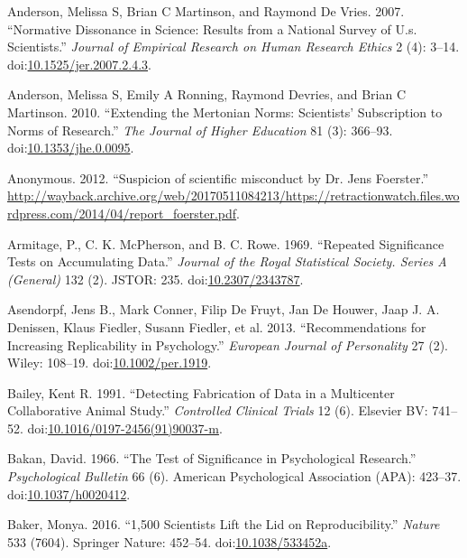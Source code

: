 \documentclass[a5paper]{book}
\begin{document}
\hypertarget{ref-doi:10.1525ux2fjer.2007.2.4.3}{}
Anderson, Melissa S, Brian C Martinson, and Raymond De Vries. 2007.
``Normative Dissonance in Science: Results from a National Survey of
U.s. Scientists.'' \emph{Journal of Empirical Research on Human Research
Ethics} 2 (4): 3--14.
doi:\href{https://doi.org/10.1525/jer.2007.2.4.3}{10.1525/jer.2007.2.4.3}.

\hypertarget{ref-doi:10.1353ux2fjhe.0.0095}{}
Anderson, Melissa S, Emily A Ronning, Raymond Devries, and Brian C
Martinson. 2010. ``Extending the Mertonian Norms: Scientists'
Subscription to Norms of Research.'' \emph{The Journal of Higher
Education} 81 (3): 366--93.
doi:\href{https://doi.org/10.1353/jhe.0.0095}{10.1353/jhe.0.0095}.

\hypertarget{ref-foerster-complaint}{}
Anonymous. 2012. ``Suspicion of scientific misconduct by Dr. Jens
Foerster.''
\url{http://wayback.archive.org/web/20170511084213/https://retractionwatch.files.wordpress.com/2014/04/report_foerster.pdf}.

\hypertarget{ref-doi:10.2307ux2f2343787}{}
Armitage, P., C. K. McPherson, and B. C. Rowe. 1969. ``Repeated
Significance Tests on Accumulating Data.'' \emph{Journal of the Royal
Statistical Society. Series A (General)} 132 (2). JSTOR: 235.
doi:\href{https://doi.org/10.2307/2343787}{10.2307/2343787}.

\hypertarget{ref-doi:10.1002ux2fper.1919}{}
Asendorpf, Jens B., Mark Conner, Filip De Fruyt, Jan De Houwer, Jaap J.
A. Denissen, Klaus Fiedler, Susann Fiedler, et al. 2013.
``Recommendations for Increasing Replicability in Psychology.''
\emph{European Journal of Personality} 27 (2). Wiley: 108--19.
doi:\href{https://doi.org/10.1002/per.1919}{10.1002/per.1919}.

\hypertarget{ref-doi:10.1016ux2f0197-24569190037-M}{}
Bailey, Kent R. 1991. ``Detecting Fabrication of Data in a Multicenter
Collaborative Animal Study.'' \emph{Controlled Clinical Trials} 12 (6).
Elsevier BV: 741--52.
doi:\href{https://doi.org/10.1016/0197-2456(91)90037-m}{10.1016/0197-2456(91)90037-m}.

\hypertarget{ref-doi:10.1037ux2fh0020412}{}
Bakan, David. 1966. ``The Test of Significance in Psychological
Research.'' \emph{Psychological Bulletin} 66 (6). American Psychological
Association (APA): 423--37.
doi:\href{https://doi.org/10.1037/h0020412}{10.1037/h0020412}.

\hypertarget{ref-doi:10.1038ux2f533452a}{}
Baker, Monya. 2016. ``1,500 Scientists Lift the Lid on
Reproducibility.'' \emph{Nature} 533 (7604). Springer Nature: 452--54.
doi:\href{https://doi.org/10.1038/533452a}{10.1038/533452a}.
\end{document}
